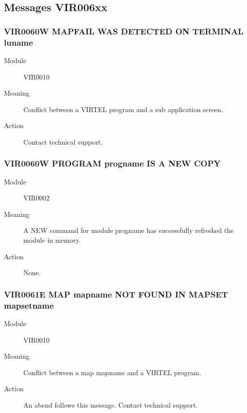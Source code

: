 \documentclass[letterpaper,10pt,english]{sphinxmanual}
\begin{document}
\subsection{Messages VIR006xx}
\label{\detokenize{messages:messages-vir006xx}}

\subsubsection{VIR0060W MAPFAIL WAS DETECTED ON TERMINAL luname}
\label{\detokenize{messages:vir0060w-mapfail-was-detected-on-terminal-luname}}\begin{description}
\item[{Module}] \leavevmode
VIR0010

\item[{Meaning}] \leavevmode
Conflict between a VIRTEL program and a sub application screen.

\item[{Action}] \leavevmode
Contact technical support.

\end{description}


\subsubsection{VIR0060W PROGRAM progname IS A NEW COPY}
\label{\detokenize{messages:vir0060w-program-progname-is-a-new-copy}}\begin{description}
\item[{Module}] \leavevmode
VIR0002

\item[{Meaning}] \leavevmode
A NEW command for module progname has successfully refreshed the module in memory.

\item[{Action}] \leavevmode
None.

\end{description}


\subsubsection{VIR0061E MAP mapname NOT FOUND IN MAPSET mapsetname}
\label{\detokenize{messages:vir0061e-map-mapname-not-found-in-mapset-mapsetname}}\begin{description}
\item[{Module}] \leavevmode
VIR0010

\item[{Meaning}] \leavevmode
Conflict between a map mapname and a VIRTEL program.

\item[{Action}] \leavevmode
An abend follows this message. Contact technical support.

\end{description}
\end{document}
